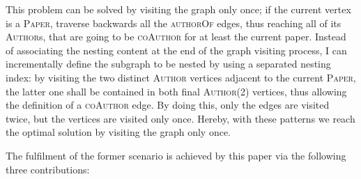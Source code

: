 \begin{example}
	
	This problem can be solved by visiting the graph only once; %
	if the current vertex is a \textsc{Paper}, traverse backwards all the \textsc{authorOf} edges, thus reaching all of its \textsc{Author}s, that are going to be \textsc{coAuthor} for at least the current paper. Instead of associating the nesting content at the end of the graph visiting process, I can incrementally define the subgraph to be nested by using a separated nesting index: by visiting the two distinct \textsc{Author} vertices adjacent to the current \textsc{Paper}, the latter one shall  be contained in both final \textsc{Author}(2) vertices, thus allowing the definition of a  \textsc{coAuthor} edge. %
	By doing this, only the edges are visited twice, but the vertices are visited only once. Hereby, with these patterns we reach the optimal solution by visiting the graph only once.
	
\end{example}


The fulfilment of the former scenario is achieved by this paper via the following three contributions:


